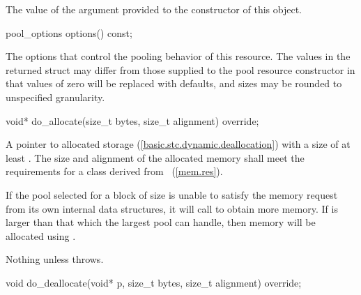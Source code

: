 \begin{itemdescr}
\pnum
\returns
The value of the  argument
provided to the constructor of this object.
\end{itemdescr}

%
%
\begin{itemdecl}
pool_options options() const;
\end{itemdecl}

\begin{itemdescr}
\pnum
\returns
The options that control the pooling behavior of this resource.
The values in the returned struct may differ
from those supplied to the pool resource constructor in that
values of zero will be replaced with 
defaults, and sizes may be rounded to unspecified granularity.
\end{itemdescr}

%
%
\begin{itemdecl}
void* do_allocate(size_t bytes, size_t alignment) override;
\end{itemdecl}

\begin{itemdescr}
\pnum
\returns
A pointer to allocated storage (\ref{basic.stc.dynamic.deallocation})
with a size of at least .
The size and alignment of the allocated memory shall meet the requirements
for a class derived from ~(\ref{mem.res}).

\pnum
\effects
If the pool selected for a block of size 
is unable to satisfy the memory request from its own internal data structures,
it will call  to obtain more memory.
If  is larger than that which the largest pool can handle,
then memory will be allocated using .

\pnum
\throws
Nothing unless  throws.
\end{itemdescr}

%
%
\begin{itemdecl}
void do_deallocate(void* p, size_t bytes, size_t alignment) override;
\end{itemdecl}

